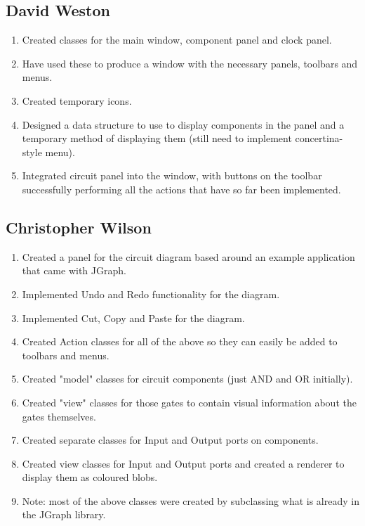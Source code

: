 \documentclass[12pt, a4paper, oneside,titlepage]{article}
\begin{document}
\subsection{David Weston}
\begin{enumerate}
\item Created classes for the main window, component panel and clock panel.
\item Have used these to produce a window with the necessary panels, toolbars and menus.
\item Created temporary icons.
\item Designed a data structure to use to display components in the panel and a temporary method of displaying them
(still need to implement concertina-style menu). 
\item Integrated circuit panel into the window, with buttons on the toolbar successfully performing all the actions that have so far been implemented.
\end{enumerate}
\subsection{Christopher Wilson}
\begin{enumerate}
    \item Created a panel for the circuit diagram based around an example application that came with JGraph.
    \item Implemented Undo and Redo functionality for the diagram.
    \item Implemented Cut, Copy and Paste for the diagram.
    \item Created Action classes for all of the above so they can easily be added to toolbars and menus.
    \item Created "model" classes for circuit components (just AND and OR initially).
    \item Created "view" classes for those gates to contain visual information about the gates themselves.
    \item Created separate classes for Input and Output ports on components.
    \item Created view classes for Input and Output ports and created a renderer to display them as coloured blobs.
    \item Note: most of the above classes were created by subclassing what is already in the JGraph library.
\end{enumerate}
\end{document}
